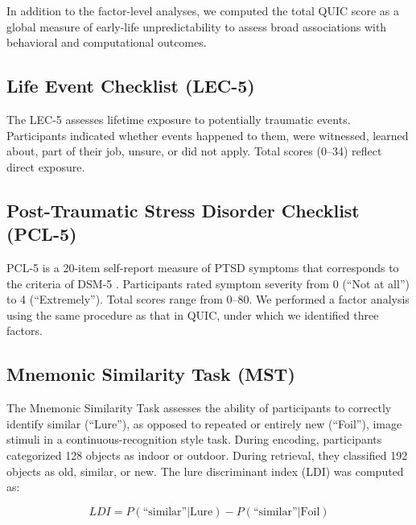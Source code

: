 \documentclass[12pt]{article}
\begin{document}
In addition to the factor-level analyses, we computed the total QUIC score as a global measure of early-life unpredictability to assess broad associations with behavioral and computational outcomes.

\subsection*{Life Event Checklist (LEC-5)}

The LEC-5 assesses lifetime exposure to potentially traumatic events. Participants indicated whether events happened to them, were witnessed, learned about, part of their job, unsure, or did not apply. Total scores (0–34) reflect direct exposure.


\subsection*{Post-Traumatic Stress Disorder Checklist (PCL-5)}

PCL-5 is a 20-item self-report measure of PTSD symptoms that corresponds to the criteria of DSM-5 \citep{wortmann2016psychometric}. Participants rated symptom severity from 0 (“Not at all”) to 4 (“Extremely”). Total scores range from 0–80. We performed a factor analysis using the same procedure as that in QUIC, under which we identified three factors. 


\subsection*{Mnemonic Similarity Task (MST)}

The Mnemonic Similarity Task \citep{stark2019mnemonic} assesses the ability of participants to correctly identify similar (``Lure''), as opposed to repeated or entirely new (``Foil''), image stimuli in a continuous-recognition style task. During encoding, participants categorized 128 objects as indoor or outdoor. During retrieval, they classified 192 objects as old, similar, or new. The lure discriminant index (LDI) was computed as:

\[
LDI = P(\text{“similar”|Lure}) - P(\text{“similar”|Foil})
\]
\end{document}
